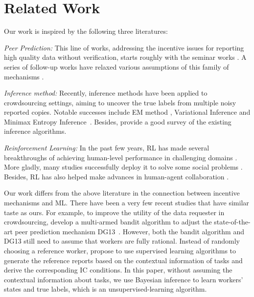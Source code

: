 \section{Related Work}
Our work is inspired by the following three literatures:

\emph{Peer Prediction:} This line of works, addressing the incentive issues for reporting high quality data without verification, starts roughly with the seminar works \cite{prelec2004bayesian,gneiting2007strictly}. A series of follow-up works have relaxed various assumptions of this family of mechanisms \cite{jurca2009mechanisms,witkowski2012peer,radanovic2013robust,dasgupta2013crowdsourced}. 

\emph{Inference method:} Recently, inference methods have been applied to crowdsourcing settings, aiming to uncover the true labels from multiple noisy reported copies. Notable successes include EM method \cite{dawid1979maximum,raykar2010learning,zhang2014spectral}, Variational Inference \cite{liu2012variational,chen2015statistical} and Minimax Entropy Inference~\cite{zhou2012learning,zhou2014aggregating}. Besides, \citet{zheng2017truth} provide a good survey of the existing inference algorithms.

\emph{Reinforcement Learning:} In the past few years, %
RL has made several breakthroughs of achieving human-level performance in challenging domains \citep{Mnih15,Hasselt2016DeepRL,Silver17}. More gladly, many studies successfully deploy it to solve some social problems \citep{Yu2013EmotionalMR,Leibo2017}. Besides, RL has also helped make advances in human-agent collaboration \citep{Sadhu2016ArgusSH,Wang2017}.


Our work differs from the above literature in the connection between incentive mechanisms and ML. There have been a very few recent studies that have similar taste as ours.
For example, to improve the utility of the data requester in crowdsourcing, \citet{liu2017sequential} develop a multi-armed bandit algorithm to adjust the state-of-the-art peer prediction mechanism DG13~\cite{dasgupta2013crowdsourced}.
However, both the bandit algorithm and DG13 still need to assume that workers are fully rational.
Instead of randomly choosing a reference worker, \citet{liu2017machine} propose to use supervised learning algorithms to generate the reference reports based on the contextual information of tasks and derive the corresponding IC conditions.
In this paper, without assuming the contextual information about tasks, we use Bayesian inference to learn workers' states and true labels, which is an unsupervised-learning algorithm.

